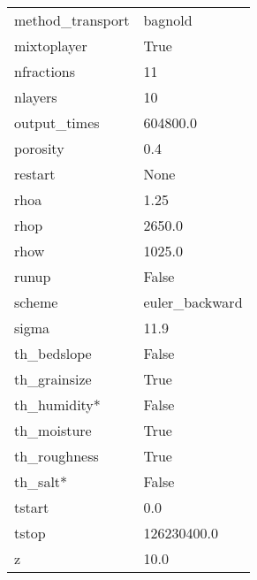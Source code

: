 \begin{longtable}{p{3cm} p{8cm}}
  method\_transport  & bagnold \\
  mixtoplayer       & True \\
  nfractions        & 11 \\
  nlayers           & 10 \\
  output\_times     & 604800.0 \\
  porosity          & 0.4 \\
  restart           & None \\
  rhoa              & 1.25 \\
  rhop              & 2650.0 \\
  rhow              & 1025.0 \\
  runup             & False \\
  scheme            & euler\_backward \\
  sigma             & 11.9 \\
  th\_bedslope      & False \\
  th\_grainsize     & True \\
  th\_humidity*     & False \\
  th\_moisture      & True \\
  th\_roughness     & True \\
  th\_salt*         & False \\
  tstart            & 0.0 \\
  tstop             & 126230400.0 \\
  z                 & 10.0 \\
  \hline
\end{longtable}

